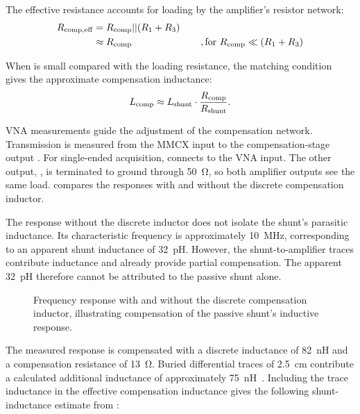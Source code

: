 The effective resistance  accounts for loading by the amplifier's resistor network:
\begin{align}
	{R}_{\mathrm{comp,eff}} &= {R}_{\mathrm{comp}} || ({R}_{\mathrm{1}}+{R}_{\mathrm{3}}) \\
					 &\approx {R}_{\mathrm{comp}} \hspace{2.5cm}, \text{for } {R}_{\mathrm{comp}} \ll ({R}_{\mathrm{1}}+{R}_{\mathrm{3}})
\end{align}

When  is small compared with the loading resistance, the matching condition gives the approximate compensation inductance:
\begin{equation}
	{L}_{\mathrm{comp}} \approx {L}_{\mathrm{shunt}}\cdot\frac{{R}_{\mathrm{comp}}}{{R}_{\mathrm{shunt}}}.
\end{equation}

VNA measurements guide the adjustment of the compensation network.
Transmission is measured from the MMCX input  to the compensation-stage output .
For single-ended acquisition,  connects to the VNA input.
The other output, , is terminated to ground through \SI{50}{\ohm}, so both amplifier outputs see the same load.
 compares the responses with and without the discrete compensation inductor.

The response without the discrete inductor does not isolate the shunt's parasitic inductance.
Its characteristic frequency is approximately \SI{10}{MHz}, corresponding to an apparent shunt inductance of \SI{32}{pH}.
However, the shunt-to-amplifier traces contribute inductance and already provide partial compensation.
The apparent \SI{32}{pH} therefore cannot be attributed to the passive shunt alone.

\begin{figure}[ht]
	\centering
	
	\caption{Frequency response with and without the discrete compensation inductor, illustrating compensation of the passive shunt's inductive response.}\label{fig:VNA_AShunt_comp}
\end{figure}

The measured response is compensated with a discrete inductance of \SI{82}{nH} and a compensation resistance of \SI{13}{\ohm}.
Buried differential traces of \SI{2.5}{cm} contribute a calculated additional inductance of approximately \SI{75}{nH}~\cite{vielspassspaeter}.
Including the trace inductance in the effective compensation inductance gives the following shunt-inductance estimate from :

